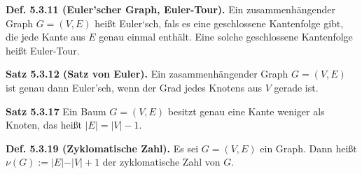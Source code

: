 \textbf{Def. 5.3.11 (Euler\textquoteright{}scher Graph, Euler-Tour).} Ein zusammenhängender Graph $G=(V,E)$ heißt Euler‘sch, fals es eine geschlossene Kantenfolge gibt, die jede Kante aus $E$ genau einmal enthält. Eine solche geschlossene Kantenfolge heißt Euler-Tour.

\textbf{Satz 5.3.12 (Satz von Euler).} Ein zasammenhängender Graph $G=(V,E)$ ist genau dann Euler’sch, wenn der Grad jedes Knotens aus $V$ gerade ist.

\textbf{Satz 5.3.17} Ein Baum $G=(V,E)$ besitzt genau eine Kante
weniger als Knoten, das heißt $\vert E\vert=\vert V\vert-1$.

\textbf{Def. 5.3.19 (Zyklomatische Zahl).} Es sei $G= (V,E)$ ein Graph. Dann heißt $\nu (G):=\vert E \vert - \vert V \vert +1$ der zyklomatische Zahl von $G$.
